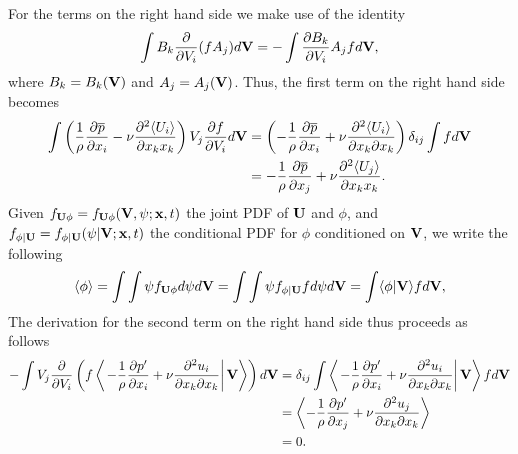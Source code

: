 \documentclass[oneside,a4paper,11pt]{report}
\newcommand{\pavg}{\overline{p}}
\newcommand{\pfluc}{p'}
\newcommand{\uiavg}{\langle U_i \rangle}
\newcommand{\ujavg}{\langle U_j \rangle}
\newcommand{\uifluc}{u_i}
\newcommand{\ujfluc}{u_j}
\begin{document}
For the terms on the right hand side we make use of the identity
\begin{equation}
\int B_k \frac{\partial}{\partial V_i} ( f A_j ) d\mathbf{V} = - \int \frac{\partial B_k}{\partial V_i} A_j f d\mathbf{V},
\end{equation}
where $B_k = B_k(\mathbf{V})$ and $A_j = A_j(\mathbf{V})$.
Thus, the first term on the right hand side becomes
\begin{align}
\int \left ( \frac{1}{\rho} \frac{\partial \pavg}{\partial x_i} -\nu \frac{\partial^2 \uiavg}{\partial x_k x_k} \right) V_j \frac{\partial f}{\partial V_i} d\Vvec & = \left (- \frac{1}{\rho} \frac{\partial \pavg}{\partial x_i} + \nu \frac{\partial^2 \uiavg}{\partial x_k \partial x_k} \right) \delta_{ij} \int f d\Vvec \nonumber \\
& = -\frac{1}{\rho} \frac{\partial \pavg}{\partial x_j} + \nu \frac{\partial ^2 \ujavg}{\partial x_k x_k}.
\end{align}
Given $f_{\mathbf{U} \phi} = f_{\mathbf{U} \phi}(\mathbf{V}, \psi; \mathbf{x}, t)$ the joint PDF of $\mathbf{U}$ and $\phi$, and $f_{\phi | \mathbf{U}} = f_{\phi | \mathbf{U}}(\psi | \mathbf{V}; \mathbf{x}, t)$ the conditional PDF for $\phi$ conditioned on $\mathbf{V}$, we write the following 
\begin{equation}
\langle \phi \rangle = \int \int \psi f_{\mathbf{U} \phi} d\psi d\mathbf{V} = \int \int \psi f_{\phi | \mathbf{U}} f d\psi d\mathbf{V} = \int \langle \phi | \mathbf{V} \rangle f d\mathbf{V},
\end{equation}
The derivation for the second term on the right hand side thus proceeds as follows
\begin{align}
-\int V_j \frac{\partial}{\partial V_i} \left ( f \left < \left . - \frac{1}{\rho} \frac{\partial \pfluc}{\partial x_i} + \nu \frac{\partial^2 \uifluc}{\partial x_k \partial x_k} \right | \Vvec \right > \right ) d\Vvec &= \delta_{ij} \int \left < \left . - \frac{1}{\rho} \frac{\partial \pfluc}{\partial x_i} + \nu \frac{\partial^2 \uifluc}{\partial x_k \partial x_k} \right | \Vvec \right > f d\Vvec \nonumber \\
& = \left < - \frac{1}{\rho} \frac{\partial \pfluc}{\partial x_j} + \nu \frac{\partial^2 \ujfluc}{\partial x_k \partial x_k} \right > \nonumber \\
& = 0.
\end{align}
\end{document}
